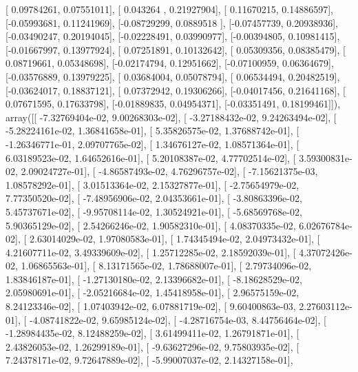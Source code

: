 \documentclass{article}
\begin{document}
       [ 0.09784261,  0.07551011],
       [ 0.043264  ,  0.21927904],
       [ 0.11670215,  0.14886597],
       [-0.05993681,  0.11241969],
       [-0.08729299,  0.0889518 ],
       [-0.07457739,  0.20938936],
       [-0.03490247,  0.20194045],
       [-0.02228491,  0.03990977],
       [-0.00394805,  0.10981415],
       [-0.01667997,  0.13977924],
       [ 0.07251891,  0.10132642],
       [ 0.05309356,  0.08385479],
       [ 0.08719661,  0.05348698],
       [-0.02174794,  0.12951662],
       [-0.07100959,  0.06364679],
       [-0.03576889,  0.13979225],
       [ 0.03684004,  0.05078794],
       [ 0.06534494,  0.20482519],
       [-0.03624017,  0.18837121],
       [ 0.07372942,  0.19306266],
       [-0.04017456,  0.21641168],
       [ 0.07671595,  0.17633798],
       [-0.01889835,  0.04954371],
       [-0.03351491,  0.18199461]]), array([[ -7.32769404e-02,   9.00268303e-02],
       [ -3.27188432e-02,   9.24263494e-02],
       [ -5.28224161e-02,   1.36841658e-01],
       [  5.35826575e-02,   1.37688742e-01],
       [ -1.26346771e-01,   2.09707765e-02],
       [  1.34676127e-02,   1.08571364e-01],
       [  6.03189523e-02,   1.64652616e-01],
       [  5.20108387e-02,   4.77702514e-02],
       [  3.59300831e-02,   2.09024727e-01],
       [ -4.86587493e-02,   4.76296757e-02],
       [ -7.15621375e-03,   1.08578292e-01],
       [  3.01513364e-02,   2.15327877e-01],
       [ -2.75654979e-02,   7.77350520e-02],
       [ -7.48956906e-02,   2.04353661e-01],
       [ -3.80863396e-02,   5.45737671e-02],
       [ -9.95708114e-02,   1.30524921e-01],
       [ -5.68569768e-02,   5.90365129e-02],
       [  2.54266246e-02,   1.90582310e-01],
       [  4.08370335e-02,   6.02676784e-02],
       [  2.63014029e-02,   1.97080583e-01],
       [  1.74345494e-02,   2.04973432e-01],
       [  4.21607711e-02,   3.49339609e-02],
       [  1.25712285e-02,   2.18592039e-01],
       [  4.37072426e-02,   1.06865563e-01],
       [  8.13171565e-02,   1.78688007e-01],
       [  2.79734096e-02,   1.83846187e-01],
       [ -1.27130180e-02,   2.13396682e-01],
       [ -8.18628529e-02,   2.05980691e-01],
       [ -2.05216684e-02,   1.45418958e-01],
       [  2.96575159e-02,   8.24123346e-02],
       [  1.07403942e-02,   6.07881719e-02],
       [  9.60400863e-03,   2.27603112e-01],
       [ -4.08741822e-02,   9.65985124e-02],
       [ -4.28716754e-03,   8.44756464e-02],
       [ -1.28984435e-02,   8.12488259e-02],
       [  3.61499411e-02,   1.26791871e-01],
       [  2.43826053e-02,   1.26299189e-01],
       [ -9.63627296e-02,   9.75803935e-02],
       [  7.24378171e-02,   9.72647889e-02],
       [ -5.99007037e-02,   2.14327158e-01],
\end{document}

